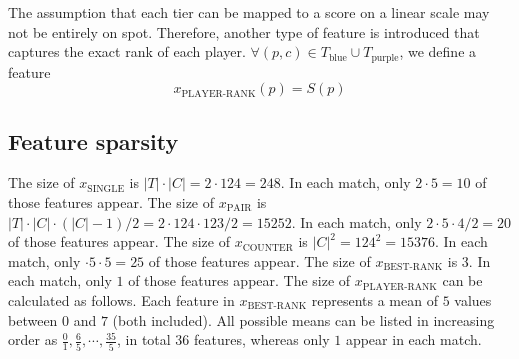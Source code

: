 The assumption that each tier can be mapped to a score on a linear scale may not be entirely on spot.
Therefore, another type of feature is introduced that captures the exact rank of each player.
$\forall(p, c) \in T_\text{blue} \cup T_\text{purple}$, we define a feature
\[
x_\text{PLAYER-RANK
}(p) = S(p)
\]


\subsection{Feature sparsity}\label{sec:featuresparsity}
The size of $x_{\text{SINGLE}}$ is $|T| \cdot |C| = 2 \cdot 124 = 248$. In each match, only $2 \cdot 5 = 10$ of those features appear.
The size of $x_{\text{PAIR}}$ is $|T| \cdot |C| \cdot (|C|-1) / 2 = 2 \cdot 124 \cdot 123 / 2 = 15252$. In each match, only $2 \cdot 5 \cdot 4 / 2 = 20$ of those features appear.
The size of $x_{\text{COUNTER}}$ is $|C|^2 = 124^2 = 15376$. In each match, only $\cdot 5 \cdot 5 = 25$ of those features appear.
The size of $x_{\text{BEST-RANK}}$ is 3. In each match, only $1$ of those features appear.
The size of $x_{\text{PLAYER-RANK}}$ can be calculated as follows. Each feature in $x_{\text{BEST-RANK}}$ represents a mean of $5$ values between $0$ and $7$ (both included). All possible means can be listed in increasing order as $\frac{0}{1}, \frac{6}{5}, \cdots, \frac{35}{5}$, in total $36$ features, whereas only $1$ appear in each match.


